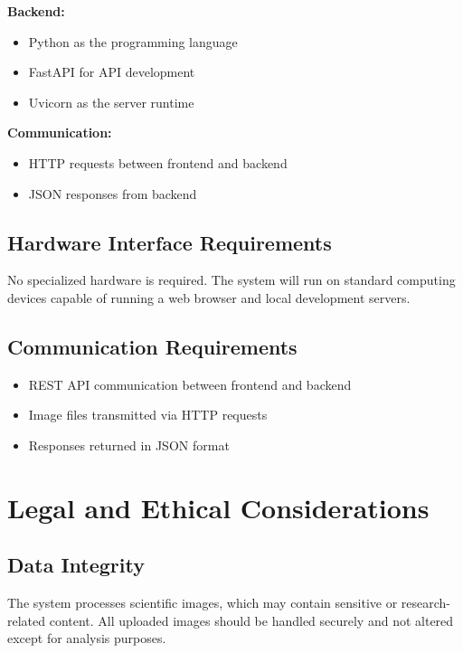 \documentclass[12pt]{article}
\begin{document}
\textbf{Backend:}

\begin{itemize}
    \item Python as the programming language
    \item FastAPI for API development
    \item Uvicorn as the server runtime
\end{itemize}

\textbf{Communication:}

\begin{itemize}
    \item HTTP requests between frontend and backend
    \item JSON responses from backend
\end{itemize}

\subsection{Hardware Interface Requirements}

No specialized hardware is required. The system will run on standard computing
devices capable of running a web browser and local development servers.

\subsection{Communication Requirements}

\begin{itemize}
    \item REST API communication between frontend and backend
    \item Image files transmitted via HTTP requests
    \item Responses returned in JSON format
\end{itemize}

\section{Legal and Ethical Considerations}

\subsection{Data Integrity}

The system processes scientific images, which may contain sensitive or
research-related content. All uploaded images should be handled securely and not
altered except for analysis purposes.
\end{document}
